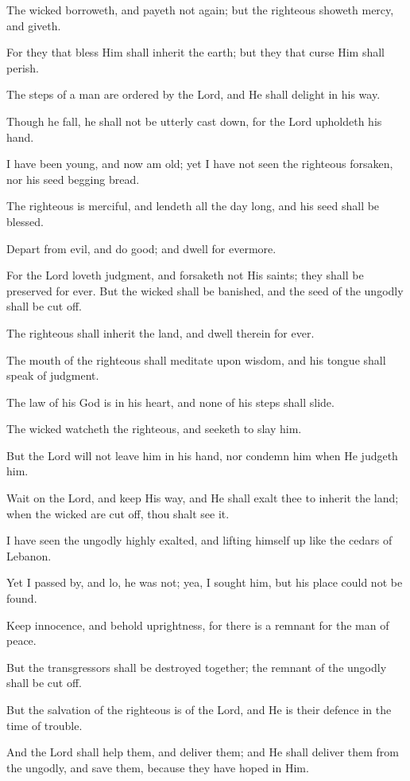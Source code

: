 The wicked borroweth, and payeth not again; but the righteous showeth mercy, and giveth.

For they that bless Him shall inherit the earth; but they that curse Him shall perish.

The steps of a man are ordered by the Lord, and He shall delight in his way.

Though he fall, he shall not be utterly cast down, for the Lord upholdeth his hand.

I have been young, and now am old; yet I have not seen the righteous forsaken, nor his seed begging bread.

The righteous is merciful, and lendeth all the day long, and his seed shall be blessed.

Depart from evil, and do good; and dwell for evermore.

For the Lord loveth judgment, and forsaketh not His saints; they shall be preserved for ever. But the wicked shall be banished, and the seed of the ungodly shall be cut off.

The righteous shall inherit the land, and dwell therein for ever.

The mouth of the righteous shall meditate upon wisdom, and his tongue shall speak of judgment.

The law of his God is in his heart, and none of his steps shall slide.

The wicked watcheth the righteous, and seeketh to slay him.

But the Lord will not leave him in his hand, nor condemn him when He judgeth him.

Wait on the Lord, and keep His way, and He shall exalt thee to inherit the land; when the wicked are cut off, thou shalt see it.

I have seen the ungodly highly exalted, and lifting himself up like the cedars of Lebanon.

Yet I passed by, and lo, he was not; yea, I sought him, but his place could not be found.

Keep innocence, and behold uprightness, for there is a remnant for the man of peace.

But the transgressors shall be destroyed together; the remnant of the ungodly shall be cut off.

But the salvation of the righteous is of the Lord, and He is their defence in the time of trouble.

And the Lord shall help them, and deliver them; and He shall deliver them from the ungodly, and save them, because they have hoped in Him.
